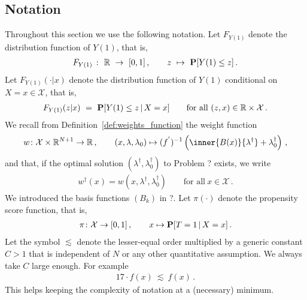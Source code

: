 \subsection*{Notation}
Throughout this section we use the following notation.
Let $F_{Y(1)}$ denote the distribution function of $Y(1)$, that is,
\begin{gather*}
  F_{Y(1)}
  \ 
  \colon
  \ 
  \R
  \ 
  \to
  \ 
  [0,1]
  \, 
  , 
  \qquad
  z
  \ 
  \mapsto
  \ 
  \P
  [
  Y(1)
  \le
  z
  ]
  \,.
\end{gather*}
Let $F_{Y(1)}(\cdot|x)$ denote the distribution function of $Y(1)$ conditional on $X=x\in\mathcal{X}$, that is,
\begin{gather*}
  F_{Y(1)}
  (z|x)
\ 
  =
\ 
  \P
  [
  Y(1)
  \le
  z
  \,
  |
  \,
  X=x
  ]
  \qquad
  \text{for all}\ 
  (z,x)\in\R\times\mathcal{X}
  \,.
\end{gather*}
We recall from Definition~\ref{def:weights_function} the weight function 
\begin{gather*}
  w
  \colon
  \mathcal{X}
  \times
  \R^{N+1}
  \to
  \R
  \,,\qquad
  \left( 
  x
  ,
  \lambda
  ,
  \lambda_0
  \right)
  \mapsto
    (
    f^{'}
    )^{-1}
    \left( 
      \inner{B(x)}{\lambda^\dagger}
      +
      \lambda_0^\dagger
    \right)
    \,,
\end{gather*}
and that, if 
  the optimal solution
  $(\lambda^\dagger,\lambda_0^\dagger)$
  to Problem ? exists, we write
  \begin{gather*}
    w^\dagger(x)
    =
    w(x,\lambda^\dagger,\lambda^\dagger_0)
    \qquad
    \text{for all}\ 
    x\in\mathcal{X}\,.
  \end{gather*}
We introduced the basis functions $(B_k)$ in ?. 
Let $\pi(\cdot)$ denote the propensity score function, that is,
\begin{gather*}
  \pi
  \colon
  \mathcal{X}
  \to
  [0,1]
  \,,
  \qquad
  x\mapsto
  \P[T=1\,|\,X=x]
  \,.
\end{gather*}
Let the symbol
$\lesssim$ denote the lesser-equal order multiplied by a generic constant $C>1$ that is independent of $N$ or any other quantitative assumption. We always take $C$ large enough.
For example
\begin{gather*}
  17\cdot f(x)\ \lesssim\  f(x)
  \,.
\end{gather*}
This helps keeping the complexity of notation at a (necessary) minimum.

